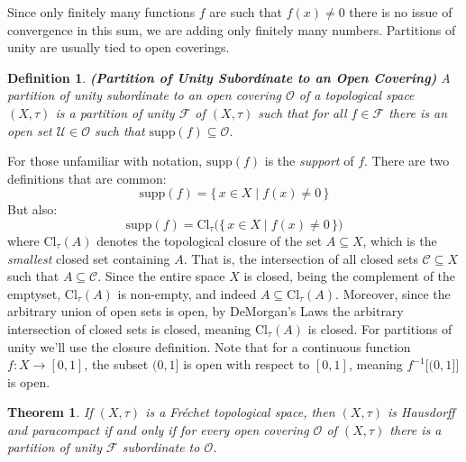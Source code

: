\documentclass{article}
\theoremstyle{plain}
\newtheorem{theorem}{Theorem}[section]
\theoremstyle{normal}
\newtheorem{definition}{Definition}[section]
\begin{document}
        Since only finitely many functions $f$ are such that $f(x)\ne{0}$ there
        is no issue of convergence in this sum, we are adding only finitely
        many numbers. Partitions of unity are usually tied to open coverings.
        \begin{definition}%
            {\textbf{(Partition of Unity Subordinate to an Open Covering)}}
            A partition of unity subordinate to an open covering $\mathcal{O}$
            of a topological space $(X,\tau)$ is a partition of unity
            $\mathcal{F}$ of $(X,\tau)$ such that for all $f\in\mathcal{F}$
            there is an open set $\mathcal{U}\in\mathcal{O}$ such that
            $\textrm{supp}(f)\subseteq\mathcal{O}$.
        \end{definition}
        For those unfamiliar with notation, $\textrm{supp}(f)$ is the
        \textit{support} of $f$. There are two definitions that are common:
        \begin{equation}
            \textrm{supp}(f)=\{\,x\in{X}\;|\;f(x)\ne{0}\,\}
        \end{equation}
        But also:
        \begin{equation}
            \textrm{supp}(f)
                =\textrm{Cl}_{\tau}\Big(\{\,x\in{X}\;|\;f(x)\ne{0}\,\}\Big)
        \end{equation}
        where $\textrm{Cl}_{\tau}(A)$ denotes the topological closure of the
        set $A\subseteq{X}$, which is the \textit{smallest} closed set
        containing $A$. That is, the intersection of all closed sets
        $\mathcal{C}\subseteq{X}$ such that $A\subseteq\mathcal{C}$. Since the
        entire space $X$ is closed, being the complement of the emptyset,
        $\textrm{Cl}_{\tau}(A)$ is non-empty, and indeed
        $A\subseteq\textrm{Cl}_{\tau}(A)$. Moreover, since the arbitrary union
        of open sets is open, by DeMorgan's Laws the arbitrary intersection of
        closed sets is closed, meaning $\textrm{Cl}_{\tau}(A)$ is closed. For
        partitions of unity we'll use the closure definition. Note that for a
        continuous function $f:X\rightarrow[0,1]$, the subset $(0,1]$ is open
        with respect to $[0,1]$, meaning $f^{-1}\big[(0,1]\big]$ is open.
        \begin{theorem}
            If $(X,\tau)$ is a Fr\'{e}chet topological space, then $(X,\tau)$ is
            Hausdorff and paracompact if and only if for every open covering
            $\mathcal{O}$ of $(X,\tau)$ there is a partition of unity
            $\mathcal{F}$ subordinate to $\mathcal{O}$.
        \end{theorem}
\end{document}
